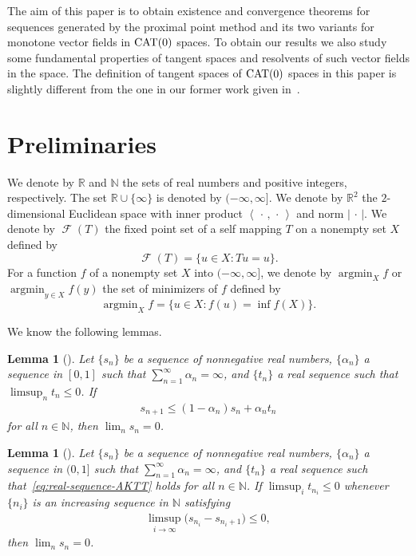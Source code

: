 \documentclass[draft]{amsart}
\numberwithin{equation}{section}
\def\N{\mathbb N}
\def\R{\mathbb R}
\newcommand{\ip}[2]{\left\langle #1, #2 \right\rangle}
\providecommand{\abs}[1]{\left\lvert#1\right\rvert}
\DeclareMathOperator*{\Argmin}{argmin}
\DeclareMathOperator{\Fix}{\mathcal{F}}
\newcommand{\CAT}{\textup{CAT}}
\theoremstyle{plain}
\newtheorem{lemma}[theorem]{Lemma}
\theoremstyle{definition}
\theoremstyle{remark}
\begin{document}
The aim of this paper is to obtain existence and convergence theorems 
for sequences generated by the proximal point method and its two variants 
for monotone vector fields in $\CAT(0)$ spaces. To obtain our results 
we also study some fundamental properties of tangent spaces and 
resolvents of such vector fields in the space. 
The definition of tangent spaces of $\CAT(0)$ spaces in this paper 
is slightly different from the one in our former work given in~\cite{MR4292325}. 

\section{Preliminaries}

We denote by $\R$ and $\N$ the sets of real numbers and 
positive integers, respectively. 
The set $\R \cup \{\infty\}$ is denoted by $(-\infty, \infty]$. 
We denote by $\R^2$ the $2$-dimensional Euclidean space 
with inner product $\ip{\,\cdot\, }{\,\cdot \,}$ 
and norm $\abs{\,\cdot \,}$. 
We denote by $\Fix (T)$ the fixed point set of a self mapping $T$ 
on a nonempty set $X$ 
defined by 
\[
 \Fix (T)=\{u\in X: Tu=u\}. 
\]
For a function $f$ of a nonempty set $X$ into 
$(-\infty, \infty]$, we denote 
by $\Argmin_X f$ or $\Argmin_{y\in X} f(y)$ 
the set of minimizers of $f$ defined by 
\[
 \Argmin_X f = \bigl\{u\in X: f(u) = \inf f(X)\bigr\}. 
\]

We know the following lemmas. 
\begin{lemma}[\cite{MR2338104}]\label{lem:real-sequence-AKTT}
 Let $\{s_n\}$ be a sequence of nonnegative real numbers, $\{\alpha_n\}$ a sequence in $[0,1]$ 
 such that $\sum_{n=1}^{\infty}\alpha_n = \infty$, and $\{t_n\}$ a real sequence such that 
 $\limsup_n t_n\leq 0$. If 
 \begin{align}\label{eq:real-sequence-AKTT}
  s_{n+1} \leq (1-\alpha_n) s_n + \alpha_n t_n
 \end{align}
 for all $n\in \N$, then $\lim_{n}s_n =0$. 
\end{lemma}

\begin{lemma}[\cites{MR3570781, MR2847453}]\label{lem:real-sequence-KSY}
 Let $\{s_n\}$ be a sequence of nonnegative real numbers, $\{\alpha_n\}$ a sequence in $(0,1]$ 
 such that $\sum_{n=1}^{\infty}\alpha_n = \infty$, and $\{t_n\}$ a real sequence 
 such that~\eqref{eq:real-sequence-AKTT} holds for all $n\in \N$. 
 If $\limsup_i t_{n_i}\leq 0$ whenever $\{n_i\}$ is an increasing sequence in $\N$ satisfying 
 \begin{align*}
  \limsup_{i\to \infty} \bigl(s_{n_i}-s_{n_i+1}\bigr) \leq 0, 
 \end{align*}
 then $\lim_{n}s_n =0$. 
\end{lemma}
\end{document}
